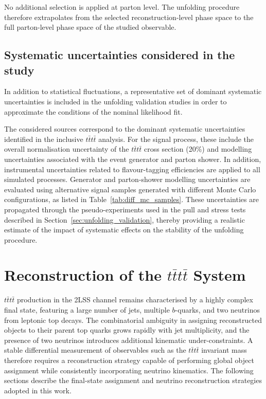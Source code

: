 No additional selection is applied at parton level. 
The unfolding procedure therefore extrapolates from the selected reconstruction-level phase space to the full parton-level phase space of the studied observable.

\subsection{Systematic uncertainties considered in the study}

In addition to statistical fluctuations, a representative set of dominant systematic uncertainties is included in the unfolding validation studies in order to approximate the conditions of the nominal likelihood fit.

The considered sources correspond to the dominant systematic uncertainties identified in the inclusive $t\bar{t}t\bar{t}$ analysis. 
For the signal process, these include the overall normalisation uncertainty of the $t\bar{t}t\bar{t}$ cross section (20\%) and modelling uncertainties associated with the event generator and parton shower. 
In addition, instrumental uncertainties related to flavour-tagging efficiencies are applied to all simulated processes.
Generator and parton-shower modelling uncertainties are evaluated using alternative signal samples generated with different Monte Carlo configurations, as listed in Table~\ref{tab:diff_mc_samples}. 
These uncertainties are propagated through the pseudo-experiments used in the pull and stress tests described in Section~\ref{sec:unfolding_validation}, thereby providing a realistic estimate of the impact of systematic effects on the stability of the unfolding procedure.

\section{Reconstruction of the $t\bar{t}t\bar{t}$ System}

$t\bar{t}t\bar{t}$ production in the 2LSS channel remains characterised by a highly complex final state, featuring a large number of jets, multiple $b$-quarks, and two neutrinos from leptonic top decays. 
The combinatorial ambiguity in assigning reconstructed objects to their parent top quarks grows rapidly with jet multiplicity, and the presence of two neutrinos introduces additional kinematic under-constraints. 
A stable differential measurement of observables such as the $t\bar{t}t\bar{t}$ invariant mass therefore requires a reconstruction strategy capable of performing global object assignment while consistently incorporating neutrino kinematics.
The following sections describe the final-state assignment and neutrino reconstruction strategies adopted in this work.

